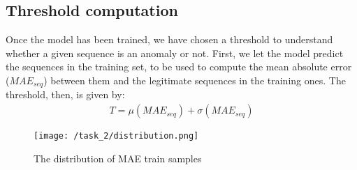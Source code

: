 \documentclass[12pt,a4paper,leqno]{article}
\begin{document}
	\subsection{Threshold computation}
	Once the model has been trained, we have chosen a threshold to understand whether a given sequence is an anomaly or not. First, we let the model predict the sequences in the training set, to be used to compute the mean absolute error ($MAE_{seq}$) between them and the legitimate sequences in the training ones. The threshold, then, is given by:\\
	\begin{gather*}
		T = \mu(MAE_{seq}) + \sigma(MAE_{seq})
	\end{gather*}
	\begin{figure}
		\centering
		\texttt{[image: /task\_2/distribution.png]}
		\caption{The distribution of MAE train samples}
		\label{task_2/distribution}
	\end{figure}
	
\end{document}
